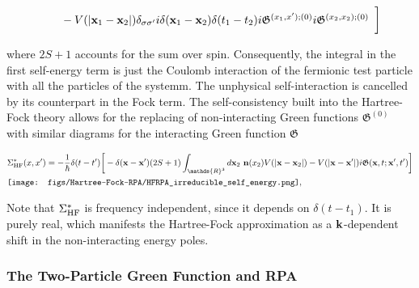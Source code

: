 \begin{equation}
\begin{split}
\begin{array}{cc}
             \textnormal{ } \textnormal{ } \textnormal{ } \textnormal{ } - V(|{\bf x}_1 - {\bf x}_2|)\delta_{\sigma \sigma'} i \delta({\bf x}_1 - {\bf x}_2) \delta(t_1-t_2) 
                i \mathfrak{G}^{(x_1,x'); (0)} i \mathfrak{G}^{(x_2, x_2); (0)} 
                \end{array} \bigg] \\
    \end{split}
\end{equation}

where $2S+1$ accounts for the sum over spin. Consequently, the integral in the first self-energy term is just the Coulomb interaction of the fermionic test particle with all the particles of the systemm. The unphysical self-interaction is cancelled by its counterpart in the Fock term. The self-consistency built into the Hartree-Fock theory allows for the replacing of non-interacting Green functions $\mathfrak{G}^{(0)}$ with similar diagrams for the interacting Green function $\mathfrak{G}$

\begin{equation}
\begin{split}
    &\Sigma^{*}_{\textnormal{HF}}(x,x') =  - \frac{1}{\hbar} \delta(t-t') \bigg[-\delta({\bf x} - {\bf x}') (2S+1) \int_{\mathds{R}^3} d{\bf x}_2 \blanky {\bf n}(x_2) V(|{\bf x}- {\bf x}_2|) - V(|{\bf x} - {\bf x'}|) i \mathfrak{G}({\bf x}, t; {\bf x}', t')\bigg]
        \\
    & \texttt{[image: figs/Hartree-Fock-RPA/HFRPA\_irreducible\_self\_energy.png]},
\end{split}
\end{equation}

Note that $\Sigma_{\textnormal{HF}}^{*}$ is frequency independent, since it depends on $\delta(t-t_1)$. It is purely real, which manifests the Hartree-Fock approximation as a ${\bf k}$-dependent shift in the non-interacting energy poles. \\

\subsubsection{The Two-Particle Green Function and RPA}

